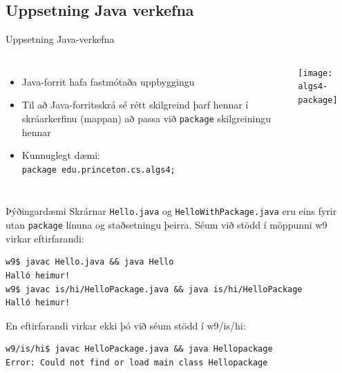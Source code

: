 \documentclass{beamer}
\begin{document}

\subsection{Uppsetning Java verkefna}

\begin{frame}{Uppsetning Java-verkefna}
	\begin{columns}
		\begin{itemize}
			\item Java-forrit hafa fastmótaða uppbyggingu
			\item Til að Java-forritsskrá sé rétt skilgreind þarf hennar í skráarkerfinu (mappan) að passa við \texttt{package} skilgreiningu hennar
			\item Kunnuglegt dæmi:\\ \texttt{\scriptsize package edu.princeton.cs.algs4;}
		\end{itemize}
		\texttt{[image: algs4-package]}
	\end{columns}
\end{frame}

\begin{frame}[fragile]{Þýðingardæmi}
	Skrárnar \texttt{Hello.java} og \texttt{HelloWithPackage.java} eru eins fyrir utan \texttt{package} línuna og staðsetningu þeirra. Séum við stödd í möppunni w9 virkar eftirfarandi:

	\begin{verbatim}
w9$ javac Hello.java && java Hello
Halló heimur!
w9$ javac is/hi/HelloPackage.java && java is/hi/HelloPackage
Halló heimur!
\end{verbatim}
	En eftirfarandi virkar ekki þó við séum stödd í w9/is/hi:
	\begin{verbatim}
w9/is/hi$ javac HelloPackage.java && java Hellopackage
Error: Could not find or load main class Hellopackage
\end{verbatim}
\end{frame}
\end{document}
